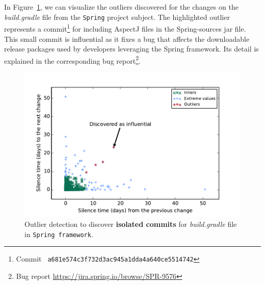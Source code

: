 In Figure~\ref{fig:build-gradle}, we can visualize the outliers discovered for
the changes on the {\em build.gradle} file from the {\tt Spring} project
subject. The highlighted outlier represents a commit\footnote{Commit \tt\small
a681e574c3f732d3ac945a1dda4a640ce5514742} for including AspectJ files in the
Spring-sources jar file. This small commit is influential as it
fixes a bug that affects the downloadable release packages used by developers
leveraging the Spring framework. Its detail is explained in the corresponding bug report\footnote{Bug report \url{https://jira.spring.io/browse/SPR-9576}}.


\begin{figure}[h!]
\centering
\includegraphics[width=0.6\linewidth]{fig/build-gradle.pdf}
\caption{Outlier detection to discover {\bf isolated commits} for {\em build.gradle} file in {\tt Spring framework}.}
\label{fig:build-gradle}
\end{figure}


%




